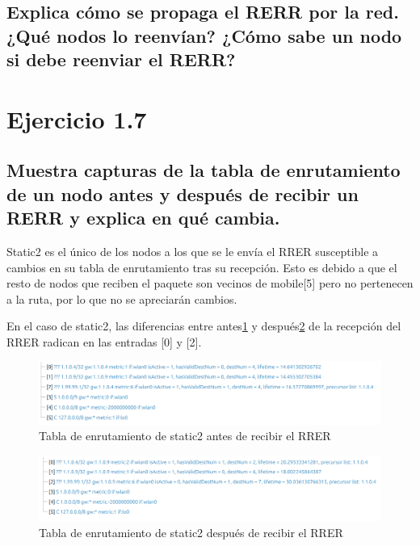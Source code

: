 \subsection{Explica cómo se propaga el RERR por la red. ¿Qué nodos lo reenvían? ¿Cómo sabe un nodo si debe reenviar
el RERR?}



\vspace{1.25cm}
\section{Ejercicio 1.7} 

\subsection{Muestra capturas de la tabla de enrutamiento de un nodo antes y después de recibir un RERR y explica en
qué cambia.}

Static2 es el único de los nodos a los que se le envía el RRER susceptible a cambios en su tabla de enrutamiento tras su recepción. Esto es debido a que el resto de nodos que reciben el paquete son vecinos de mobile[5] pero no pertenecen a la ruta, por lo que no se apreciarán cambios.

En el caso de static2, las diferencias entre antes\ref{fig:RerrRouteTablePre} y después\ref{fig:RerrRouteTablePos} de la recepción del RRER radican en las entradas [0] y [2]. 

\begin{figure}[H]
    \centering
    \includegraphics[width=125mm, scale=0.75]{imaxes/ejercicio7_1.png}
    \caption{Tabla de enrutamiento de static2 antes de recibir el RRER}
    \label{fig:RerrRouteTablePre}
\end{figure}

\begin{figure}[H]
    \centering
    \includegraphics[width=125mm, scale=0.75]{imaxes/ejercicio7_2.png}
    \caption{Tabla de enrutamiento de static2 después de recibir el RRER}
    \label{fig:RerrRouteTablePos}
\end{figure}


